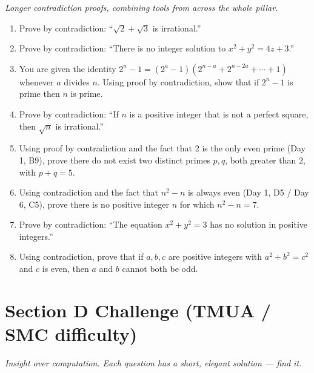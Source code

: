 \documentclass[11pt,a4paper]{article}
\begin{document}
\noindent\textit{Longer contradiction proofs, combining tools from across the whole pillar.}

\begin{enumerate}

\item Prove by contradiction: ``$\sqrt2+\sqrt3$ is irrational.''

\item Prove by contradiction: ``There is no integer solution to $x^2+y^2=4z+3$.''

\item You are given the identity $2^n-1=(2^a-1)(2^{n-a}+2^{n-2a}+\cdots+1)$ whenever $a$ divides $n$. Using proof by contradiction, show that if $2^n-1$ is prime then $n$ is prime.

\item Prove by contradiction: ``If $n$ is a positive integer that is not a perfect square, then $\sqrt n$ is irrational.''

\item Using proof by contradiction and the fact that $2$ is the only even prime (Day 1, B9), prove there do not exist two distinct primes $p,q$, both greater than $2$, with $p+q=5$.

\item Using contradiction and the fact that $n^2-n$ is always even (Day 1, D5 / Day 6, C5), prove there is no positive integer $n$ for which $n^2-n=7$.

\item Prove by contradiction: ``The equation $x^2+y^2=3$ has no solution in positive integers.''

\item Using contradiction, prove that if $a,b,c$ are positive integers with $a^2+b^2=c^2$ and $c$ is even, then $a$ and $b$ cannot both be odd.

\end{enumerate}

\section*{Section D \quad Challenge \hfill{\normalfont\small(TMUA / SMC difficulty)}}

\noindent\textit{Insight over computation. Each question has a short, elegant solution --- find it.}
\end{document}
